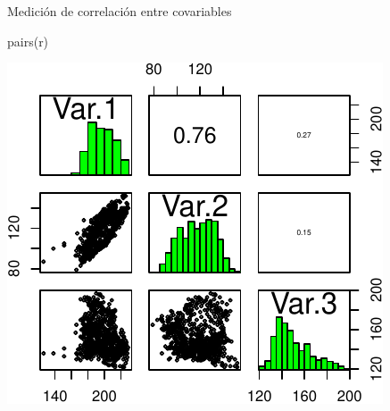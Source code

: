 \documentclass[
  11pt,
  ignorenonframetext,
]{beamer}
\newenvironment{Shaded}{}{}
\newcommand{\FunctionTok}[1]{\textcolor[rgb]{0.02,0.16,0.49}{#1}}
\newcommand{\NormalTok}[1]{#1}
\begin{document}
\begin{frame}[fragile]{Medición de correlación entre covariables}
\protect\hypertarget{mediciuxf3n-de-correlaciuxf3n-entre-covariables}{}
\begin{Shaded}
\begin{Highlighting}[]
\FunctionTok{pairs}\NormalTok{(r)}
\end{Highlighting}
\end{Shaded}

\begin{center}\includegraphics{Tutorial-spatstat-2_files/figure-beamer/unnamed-chunk-13-1} \end{center}
\end{frame}
\end{document}

